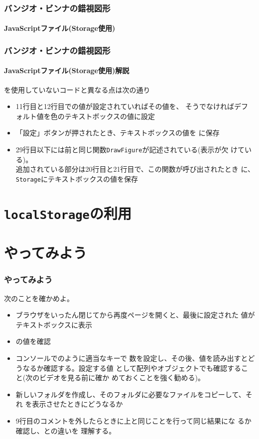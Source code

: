 \begin{frame}[containsverbatim]
 \frametitle{バンジオ・ビンナの錯視図形}
 \framesubtitle{JavaScriptファイル(Storage使用)}
\end{frame}
\begin{frame}[containsverbatim]
 \frametitle{バンジオ・ビンナの錯視図形}
 \framesubtitle{JavaScriptファイル(Storage使用)解説}
 を使用していないコードと異なる点は次の通り
 \begin{itemize}
  \item 11行目と12行目での値が設定されていればその値を、
        そうでなければデフォルト値を色のテキストボックスの値に設定
  \item 「設定」ボタンが押されたとき、テキストボックスの値を
        に保存
 \item 29行目以下には前と同じ関数\texttt{DrawFigure}が記述されている(表示が欠
			 けている)。\\
			 追加されている部分は20行目と21行目で、この関数が呼び出されたとき
			 に、\texttt{Storage}にテキストボックスの値を保存
 \end{itemize}
\end{frame}
\section{\texttt{localStorage}の利用}
\section{やってみよう}
\begin{frame}[containsverbatim]
\frametitle{やってみよう}
次のことを確かめよ。
\begin{itemize}
 \item ブラウザをいったん閉じてから再度ページを開くと、最後に設定された
       値がテキストボックスに表示
 \item {}の値を確認
 \item コンソールでのように適当なキーで
       数を設定し、その後、値を読み出すとどうなるか確認する。設定する値
       として配列やオブジェクトでも確認すること(次のビデオを見る前に確か
       めておくことを強く勧める)。
 \item 新しいフォルダを作成し、そのフォルダに必要なファイルをコピーして、それ
       を表示させたときにどうなるか
 \item 9行目のコメントを外したらときに上と同じことを行って同じ結果にな
       るか確認し、との違いを
       理解する。
\end{itemize} 
\end{frame}
 
\begin{frame}[containsverbatim]
\frametitle{}
\end{frame}
